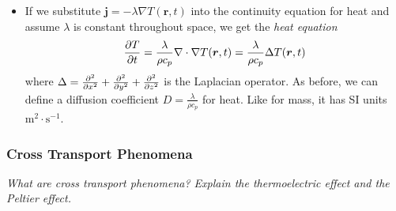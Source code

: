 \documentclass[11pt, a4paper]{article}
\begin{document}
\begin{itemize}
	\item If we substitute $ \bm{j} = - \lambda \nabla T(\bm{r}, t) $ into the continuity equation for heat and assume $ \lambda $ is constant throughout space, we get the \textit{heat equation}
	\begin{equation*}
		\pdv{T}{t} = \frac{\lambda}{\rho c_{p}} \nabla \cdot \nabla T(\bm{r}, t) = \frac{\lambda}{\rho c_{p}} \Delta T(\bm{r}, t)
	\end{equation*}
	where $ \Delta = \pdv[2]{}{x} + \pdv[2]{}{y} + \pdv[2]{}{z}$ is the Laplacian operator. As before, we can define a diffusion coefficient $ D = \frac{\lambda}{\rho c_{p}} $ for heat. Like for mass, it has SI units $ \si{\meter^{2} \cdot \second^{-1}} $.
	
\end{itemize}


\subsubsection{Cross Transport Phenomena}
\textit{What are cross transport phenomena? Explain the thermoelectric effect and the Peltier effect.}
\end{document}
